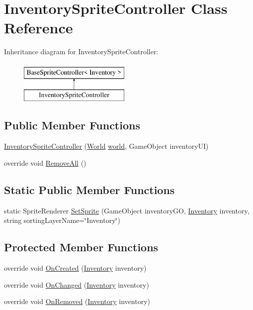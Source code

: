\hypertarget{class_inventory_sprite_controller}{}\section{Inventory\+Sprite\+Controller Class Reference}
\label{class_inventory_sprite_controller}
Inheritance diagram for Inventory\+Sprite\+Controller\+:\begin{figure}[H]
\begin{center}
\leavevmode
\includegraphics[height=2.000000cm]{class_inventory_sprite_controller}
\end{center}
\end{figure}
\subsection*{Public Member Functions}
\begin{DoxyCompactItemize}
\item 
\hyperlink{class_inventory_sprite_controller_a3e3441ca5794b786c704a9239ec87060}{Inventory\+Sprite\+Controller} (\hyperlink{class_world}{World} \hyperlink{class_base_sprite_controller_a593ea6a31165eff51a0acffc12ea65ca}{world}, Game\+Object inventory\+UI)
\item 
override void \hyperlink{class_inventory_sprite_controller_a60aa5f30a8947b7490e99592e0a87da2}{Remove\+All} ()
\end{DoxyCompactItemize}
\subsection*{Static Public Member Functions}
\begin{DoxyCompactItemize}
\item 
static Sprite\+Renderer \hyperlink{class_inventory_sprite_controller_a4f3b1f386550c7458b0abc4fe276839e}{Set\+Sprite} (Game\+Object inventory\+GO, \hyperlink{class_inventory}{Inventory} inventory, string sorting\+Layer\+Name=\char`\"{}Inventory\char`\"{})
\end{DoxyCompactItemize}
\subsection*{Protected Member Functions}
\begin{DoxyCompactItemize}
\item 
override void \hyperlink{class_inventory_sprite_controller_aef9b0fe5cb4a8f1c0a7877a283387721}{On\+Created} (\hyperlink{class_inventory}{Inventory} inventory)
\item 
override void \hyperlink{class_inventory_sprite_controller_ae0423c7f809accb92f9c42a155b0ae45}{On\+Changed} (\hyperlink{class_inventory}{Inventory} inventory)
\item 
override void \hyperlink{class_inventory_sprite_controller_a32ab66f8a43f6ae5d9a72ca15919c468}{On\+Removed} (\hyperlink{class_inventory}{Inventory} inventory)
\end{DoxyCompactItemize}

